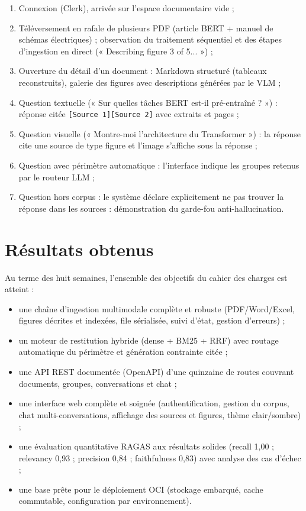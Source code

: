 \begin{enumerate}
  \item Connexion (Clerk), arrivée sur l'espace documentaire vide ;
  \item Téléversement en rafale de plusieurs PDF (article BERT + manuel de schémas
        électriques) ; observation du traitement séquentiel et des étapes d'ingestion en
        direct (« Describing figure 3 of 5... ») ;
  \item Ouverture du détail d'un document : Markdown structuré (tableaux reconstruits),
        galerie des figures avec descriptions générées par le VLM ;
  \item Question textuelle (« Sur quelles tâches BERT est-il pré-entraîné ? ») : réponse
        citée \texttt{[Source 1]}\texttt{[Source 2]} avec extraits et pages ;
  \item Question visuelle (« Montre-moi l'architecture du Transformer ») : la réponse cite
        une source de type figure et l'image s'affiche sous la réponse ;
  \item Question avec périmètre automatique : l'interface indique les groupes retenus par
        le routeur LLM ;
  \item Question hors corpus : le système déclare explicitement ne pas trouver la réponse
        dans les sources : démonstration du garde-fou anti-hallucination.
\end{enumerate}

\section{Résultats obtenus}
\label{sec:resultats}

Au terme des huit semaines, l'ensemble des objectifs du cahier des charges est atteint :

\begin{itemize}
  \item une chaîne d'ingestion multimodale complète et robuste (PDF/Word/Excel,
        figures décrites et indexées, file sérialisée, suivi d'état, gestion d'erreurs) ;
  \item un moteur de restitution hybride (dense + BM25 + RRF) avec routage automatique du
        périmètre et génération contrainte citée ;
  \item une API REST documentée (OpenAPI) d'une quinzaine de routes couvrant documents,
        groupes, conversations et chat ;
  \item une interface web complète et soignée (authentification, gestion du corpus, chat
        multi-conversations, affichage des sources et figures, thème clair/sombre) ;
  \item une évaluation quantitative RAGAS aux résultats solides (recall 1{,}00 ;
        relevancy 0{,}93 ; precision 0{,}84 ; faithfulness 0{,}83) avec analyse des cas
        d'échec ;
  \item une base prête pour le déploiement OCI (stockage embarqué, cache commutable,
        configuration par environnement).
\end{itemize}

